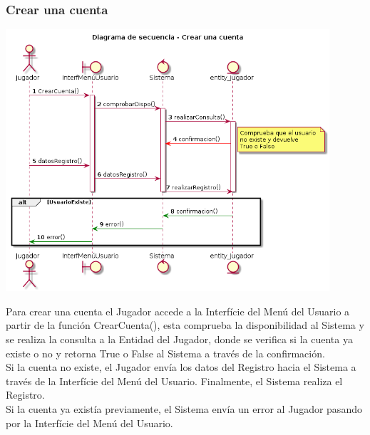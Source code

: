 \subsubsection{Crear una cuenta}
\begin{center}
  \includegraphics[width=0.9\textwidth]{./imatges/jugador/Crear_una_cuenta.png}
  \end{center}
  Para crear una cuenta el Jugador accede a la Interfície del Menú del Usuario a partir de la función CrearCuenta(), esta comprueba la disponibilidad al Sistema y se realiza la consulta a la Entidad del Jugador, donde se verifica si la cuenta ya existe o no y retorna True o False al Sistema a través de la confirmación.
  \\Si la cuenta no existe, el Jugador envía los datos del Registro hacia el Sistema a través de la Interfície del Menú del Usuario. Finalmente, el Sistema realiza el Registro.
  \\Si la cuenta ya existía previamente, el Sistema envía un error al Jugador pasando por la Interfície del Menú del Usuario.
